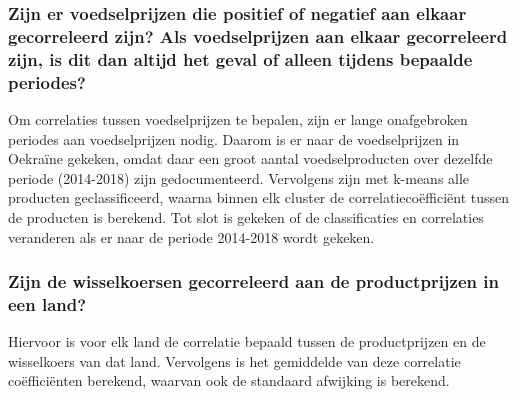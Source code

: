 \documentclass{article}
\begin{document}
\subsubsection*{Zijn er voedselprijzen die positief of negatief aan elkaar gecorreleerd zijn? Als voedselprijzen aan elkaar gecorreleerd zijn, is dit dan altijd het geval of alleen tijdens bepaalde periodes?}
Om correlaties tussen voedselprijzen te bepalen, zijn er lange onafgebroken periodes aan voedselprijzen nodig.
Daarom is er naar de voedselprijzen in Oekraïne gekeken, omdat daar een groot aantal voedselproducten over dezelfde periode (2014-2018) zijn gedocumenteerd. Vervolgens zijn met k-means alle producten geclassificeerd, waarna binnen elk cluster de correlatiecoëfficiënt tussen de producten is berekend. Tot slot is gekeken of de classificaties en correlaties veranderen als er naar de periode 2014-2018 wordt gekeken.

\subsubsection*{Zijn de wisselkoersen gecorreleerd aan de productprijzen in een land?}
Hiervoor is voor elk land de correlatie bepaald tussen de productprijzen en de wisselkoers van dat land. 
Vervolgens is het gemiddelde van deze correlatie coëfficiënten berekend, waarvan ook de standaard afwijking is berekend.

\end{document}

